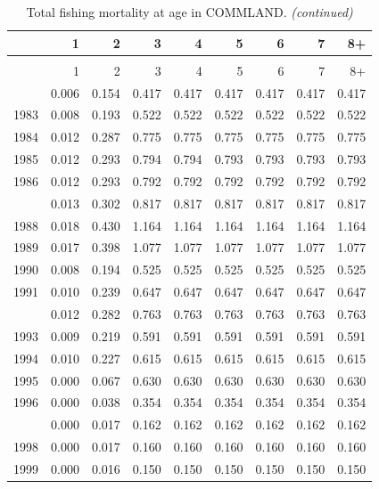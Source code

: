 \documentclass[
]{article}
\begin{document}
\begin{longtable}[t]{lrrrrrrrr}
\caption{\label{tab:COMMLAND-fleet-FAA-table}Total fishing mortality at age in COMMLAND.}\\
\toprule
  & 1 & 2 & 3 & 4 & 5 & 6 & 7 & 8+\\
\midrule
\endfirsthead
\caption[]{Total fishing mortality at age in COMMLAND. \textit{(continued)}}\\
\toprule
  & 1 & 2 & 3 & 4 & 5 & 6 & 7 & 8+\\
\midrule
\endhead

\endfoot
\bottomrule
\endlastfoot
1982 & 0.006 & 0.154 & 0.417 & 0.417 & 0.417 & 0.417 & 0.417 & 0.417\\
1983 & 0.008 & 0.193 & 0.522 & 0.522 & 0.522 & 0.522 & 0.522 & 0.522\\
1984 & 0.012 & 0.287 & 0.775 & 0.775 & 0.775 & 0.775 & 0.775 & 0.775\\
1985 & 0.012 & 0.293 & 0.794 & 0.794 & 0.793 & 0.793 & 0.793 & 0.793\\
1986 & 0.012 & 0.293 & 0.792 & 0.792 & 0.792 & 0.792 & 0.792 & 0.792\\
\addlinespace
1987 & 0.013 & 0.302 & 0.817 & 0.817 & 0.817 & 0.817 & 0.817 & 0.817\\
1988 & 0.018 & 0.430 & 1.164 & 1.164 & 1.164 & 1.164 & 1.164 & 1.164\\
1989 & 0.017 & 0.398 & 1.077 & 1.077 & 1.077 & 1.077 & 1.077 & 1.077\\
1990 & 0.008 & 0.194 & 0.525 & 0.525 & 0.525 & 0.525 & 0.525 & 0.525\\
1991 & 0.010 & 0.239 & 0.647 & 0.647 & 0.647 & 0.647 & 0.647 & 0.647\\
\addlinespace
1992 & 0.012 & 0.282 & 0.763 & 0.763 & 0.763 & 0.763 & 0.763 & 0.763\\
1993 & 0.009 & 0.219 & 0.591 & 0.591 & 0.591 & 0.591 & 0.591 & 0.591\\
1994 & 0.010 & 0.227 & 0.615 & 0.615 & 0.615 & 0.615 & 0.615 & 0.615\\
1995 & 0.000 & 0.067 & 0.630 & 0.630 & 0.630 & 0.630 & 0.630 & 0.630\\
1996 & 0.000 & 0.038 & 0.354 & 0.354 & 0.354 & 0.354 & 0.354 & 0.354\\
\addlinespace
1997 & 0.000 & 0.017 & 0.162 & 0.162 & 0.162 & 0.162 & 0.162 & 0.162\\
1998 & 0.000 & 0.017 & 0.160 & 0.160 & 0.160 & 0.160 & 0.160 & 0.160\\
1999 & 0.000 & 0.016 & 0.150 & 0.150 & 0.150 & 0.150 & 0.150 & 0.150\\

\end{longtable}
\end{document}
